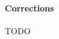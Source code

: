 \documentclass{report}
\begin{document}
			\paragraph{Corrections} TODO
			
		
		
%		
%		
%	
%	
%	
%	
%	
%	
\end{document}
